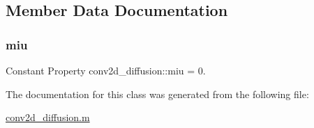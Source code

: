 \subsection{Member Data Documentation}
\mbox{\label{classconv2d__diffusion_add29da5c3b7d3836fb3ee9ddabd23f83}} 
\subsubsection{\texorpdfstring{miu}{miu}}
{\footnotesize\ttfamily Constant Property conv2d\+\_\+diffusion\+::miu = 0.}



The documentation for this class was generated from the following file\+:\begin{DoxyCompactItemize}
\item 
\hyperlink{conv2d__diffusion_8m}{conv2d\+\_\+diffusion.\+m}\end{DoxyCompactItemize}

